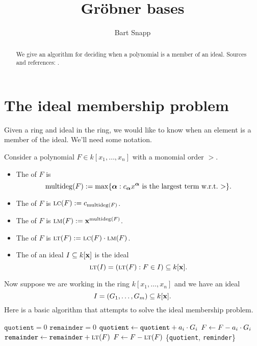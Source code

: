 \documentclass{ximera}
\title{Gr\"obner bases}
\author{Bart Snapp}
\begin{document}
\begin{abstract}
  We give an algorithm for deciding when a polynomial is a member of
  an ideal.  Sources and references: \cite{CLO2007,hS2003}.
\end{abstract}
\maketitle



\section{The ideal membership problem}

Given a ring and ideal in the ring, we would like to know when an
element is a member of the ideal. We'll need some notation.


\begin{definition}
  Consider a polynomial $F\in k[x_1,\dots, x_n]$ with a monomial order
  $>$.
  \begin{itemize}
    \item The  of $F$ is
    \[
    \operatorname{multideg}(F) := \max\{{\boldsymbol\alpha}: \text{$c_{\boldsymbol\alpha} x^{\boldsymbol\alpha}$ is the largest term w.r.t.\ $>$} \}.
    \]
  \item The  of $F$ is $\textsc{lc}(F) := c_{\operatorname{multideg}(F)}$.
  \item The  of $F$ is $\textsc{lm}(F) := \mathbf{x}^{\operatorname{multideg}(F)}$.
  \item The  of $F$ is $\textsc{lt}(F) := \textsc{lc}(F)\cdot \textsc{lm}(F)$.
  \item The  of an ideal $I\subseteq k[\mathbf{x}]$ is
    the ideal
    \[
    \textsc{lt}(I) = (\textsc{lt}(F): F\in I)\subseteq k[\mathbf{x}].
    \]
  \end{itemize}
\end{definition}

Now suppose we are working in the ring $k[x_1,\dots, x_n]$ and we have an ideal
\[
I = (G_1,\dots, G_m) \subseteq k[\mathbf{x}].
\]
Here is a basic algorithm that attempts to solve the ideal membership
problem.

\begin{algorithm}
  \hfill
  \begin{algorithmic}[1]
    \State $\texttt{quotient} = 0$
    \State $\texttt{remainder} = 0$
    \Repeat
    \State $\texttt{quotient} \leftarrow \texttt{quotient} + a_i\cdot G_i$
    \State $F \leftarrow F - a_i\cdot G_i$
    \Else
    \State $\texttt{remainder} \leftarrow \texttt{remainder} + \textsc{lt}(F)$
    \State $F\leftarrow F- \textsc{lt}(F)$
    \EndIf
    \Return\{\texttt{quotient}, \texttt{reminder}\}
    \EndProcedure
  \end{algorithmic}
\end{algorithm}
\end{document}
